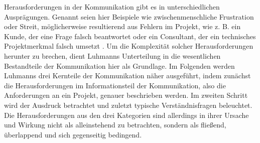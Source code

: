 \documentclass[../main.tex]{subfiles}
\begin{document}
Herausforderungen in der Kommunikation gibt es in unterschiedlichen Ausprägungen.
Genannt seien hier Beispiele wie zwischenmenschliche Frustration oder Streit, möglicherweise resultierend aus Fehlern im Projekt, wie z. B. ein Kunde, der eine Frage falsch beantwortet oder ein Consultant, der ein technisches Projektmerkmal falsch umsetzt \autocite{suleiman2022causes}.
Um die Komplexität solcher Herausforderungen herunter zu brechen, dient Luhmanns Unterteilung in die wesentlichen Bestandteile der Kommunikation hier als Grundlage.
Im Folgenden werden Luhmanns drei Kernteile der Kommunikation näher ausgeführt, indem zunächst die Herausforderungen im Informationsteil der Kommunikation, also die Anforderungen an ein Projekt, genauer beschrieben werden.
Im zweiten Schritt wird der Ausdruck betrachtet und zuletzt typische Verständnisfragen beleuchtet.
Die Herausforderungen aus den drei Kategorien sind allerdings in ihrer Ursache und Wirkung nicht als alleinstehend zu betrachten, sondern als fließend, überlappend und sich gegenseitig bedingend.
\end{document}
